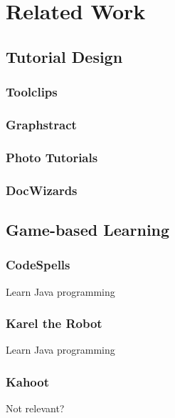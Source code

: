 \chapter{Related Work}
\label{ch:related_work}


\section{Tutorial Design}
\label{sec:tutorial_design}

\subsection{Toolclips}


\subsection{Graphstract}


\subsection{Photo Tutorials}


\subsection{DocWizards}

\section{Game-based Learning}
\label{sec:rel_game_based_learning}

\subsection{CodeSpells}
Learn Java programming

\subsection{Karel the Robot}
Learn Java programming

\subsection{Kahoot}
Not relevant?

